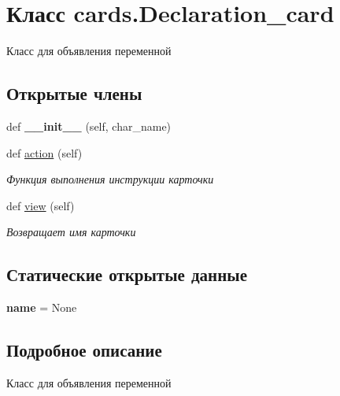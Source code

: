 \hypertarget{classcards_1_1_declaration__card}{}\section{Класс cards.\+Declaration\+\_\+card}
\label{classcards_1_1_declaration__card}


Класс для объявления переменной  


\subsection*{Открытые члены}
\begin{DoxyCompactItemize}
\item 
\mbox{\label{classcards_1_1_declaration__card_a6343450ebd50aa1ad1181ed839649746}} 
def {\bfseries \+\_\+\+\_\+init\+\_\+\+\_\+} (self, char\+\_\+name)
\item 
def \mbox{\hyperlink{classcards_1_1_declaration__card_a140fd766bb5e5acbd9d2444c691d49bb}{action}} (self)
\begin{DoxyCompactList}\small\item\em Функция выполнения инструкции карточки \end{DoxyCompactList}\item 
def \mbox{\hyperlink{classcards_1_1_declaration__card_afbed322f27dcd9c68e422a91f695d83c}{view}} (self)
\begin{DoxyCompactList}\small\item\em Возвращает имя карточки \end{DoxyCompactList}\end{DoxyCompactItemize}
\subsection*{Статические открытые данные}
\begin{DoxyCompactItemize}
\item 
\mbox{\label{classcards_1_1_declaration__card_ac84137edbf49ee9ef4012e06bce740e4}} 
{\bfseries name} = None
\end{DoxyCompactItemize}


\subsection{Подробное описание}
Класс для объявления переменной 


